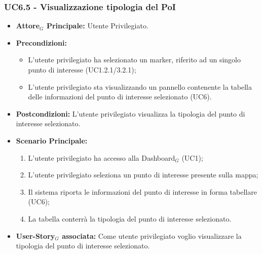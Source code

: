 \documentclass[11pt]{article}
\begin{document}
\begin{justify}
 \subsubsection{\textbf{UC6.5 - Visualizzazione tipologia del PoI}}
 \begin{itemize}
     \item \textbf{Attore$_G$ Principale:} Utente Privilegiato.
     \item \textbf{Precondizioni:}
       \begin{itemize}
    	        \item L'utente privilegiato ha selezionato un marker, riferito ad un singolo punto di interesse (UC1.2.1/3.2.1);
          \item L'utente privilegiato sta visualizzando un pannello contenente la tabella delle informazioni del punto di interesse selezionato (UC6).
       \end{itemize}
     \item \textbf{Postcondizioni:} L'utente privilegiato visualizza la tipologia del punto di interesse selezionato.
     \item \textbf{Scenario Principale:}
        \begin{enumerate}
            \item L'utente privilegiato ha accesso alla Dashboard$_G$ (UC1);
            \item L'utente privilegiato seleziona un punto di interesse presente sulla mappa;
            \item Il sistema riporta le informazioni del punto di interesse in forma tabellare (UC6);
            \item La tabella conterrà la tipologia del punto di interesse selezionato.
        \end{enumerate}
     \item \textbf{User-Story$_G$ associata:} Come utente privilegiato voglio visualizzare la tipologia del punto di interesse selezionato. 
 \end{itemize}

\end{justify}
\end{document}
